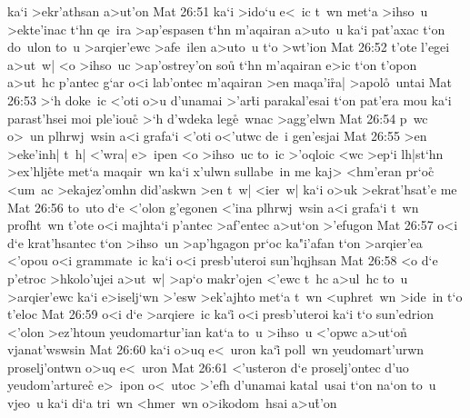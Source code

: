 ka`i
>ekr'athsan
a>ut'on\bibvsend
\vs Mat 26:51
ka`i
>ido`u
e<~ic
t~wn
met`a
>ihso~u
>ekte'inac
t`hn
qe~ira
>ap'espasen
t`hn
m'aqairan
a>uto~u
ka`i
pat'axac
t`on
do~ulon
to~u
>arqier'ewc
>afe~ilen
a>uto~u
t`o
>wt'ion\bibvsend
\vs Mat 26:52
t'ote
l'egei
a>ut~w|
<o
>ihso~uc
>ap'ostrey'on
sou\r{}
t`hn
m'aqairan
e>ic
t`on
t'opon
a>ut~hc
p'antec
g`ar
o<i
lab'ontec
m'aqairan
>en
maqa'i\r{r}a|
>apol\r{o}~untai\bibvsend
{}
\vs Mat 26:53
>`h
doke~ic
<'oti
o>u
d'unamai
>'ar\r{t}i
parakal'esai
t`on
pat'era
mou
ka`i
parast'hsei
moi
ple'iouc\r{}
>`h
d'wdeka
leg\r{e}~wnac
>agg'elwn\bibvsend
\vs Mat 26:54
p~wc
o>~un
plhrwj~wsin
a<i
grafa`i
<'oti
o<'utwc
de~i
gen'esjai\bibvsend
\vs Mat 26:55
>en
>eke'inh|
t~h|
<'wra|
e>~ipen
<o
>ihso~uc
to~ic
>'oqloic
<wc
>ep`i
lh|st`hn
>ex'hlj\r{e}te
met`a
maqair~wn
ka`i
x'ulwn
sullabe~in
me
kaj>
<hm'eran
pr`oc\r{}
<um~ac
>ekajez'omhn
did'askwn
>en
t~w|
<ier~w|
ka`i
o>uk
>ekrat'hsat'e
me\bibvsend
\vs Mat 26:56
to~uto
d`e
<'olon
g'egonen
<'ina
plhrwj~wsin
a<i
grafa`i
t~wn
profht~wn
t'ote
o<i
majhta`i
p'antec
>af'entec
a>ut`on
>'efugon\bibvsend
\vs Mat 26:57
o<i
d`e
krat'hsantec
t`on
>ihso~un
>ap'hgagon
pr`oc
ka"i'afan
t`on
>arqier'ea
<'opou
o<i
grammate~ic
ka`i
o<i
presb'uteroi
sun'hqjhsan\bibvsend
\vs Mat 26:58
<o
d`e
p'etroc
>hkolo'ujei
a>ut~w|
>ap`o
makr'ojen
<'ewc
t~hc
a>ul~hc
to~u
>arqier'ewc
ka`i
e>iselj`wn
>'esw
>ek'ajhto
met`a
t~wn
<uphret~wn
>ide~in
t`o
t'eloc\bibvsend
\vs Mat 26:59
o<i
d`e
>arqiere~ic
ka`i\r{}
o<i
presb'uteroi
ka`i
t`o
sun'edrion
<'olon
>ez'htoun
yeudomartur'ian
kat`a
to~u
>ihso~u
<'opwc
a>ut`on\r{}
vjanat'wswsin\bibvsend
\vs Mat 26:60
ka`i
o>uq
e<~uron
ka`i\r{}
poll~wn
yeudomart'urwn
proselj'ontwn
o>uq
e<~uron\bibvsend
\vs Mat 26:61
<'usteron
d`e
proselj'ontec
d'uo
yeudom'arturec\r{}
e>~ipon
o<~utoc
>'efh
d'unamai
katal~usai
t`on
na`on
to~u
vjeo~u
ka`i
di`a
tri~wn
<hmer~wn
o>ikodom~hsai
a>u\r{t}'on\bibvsend
